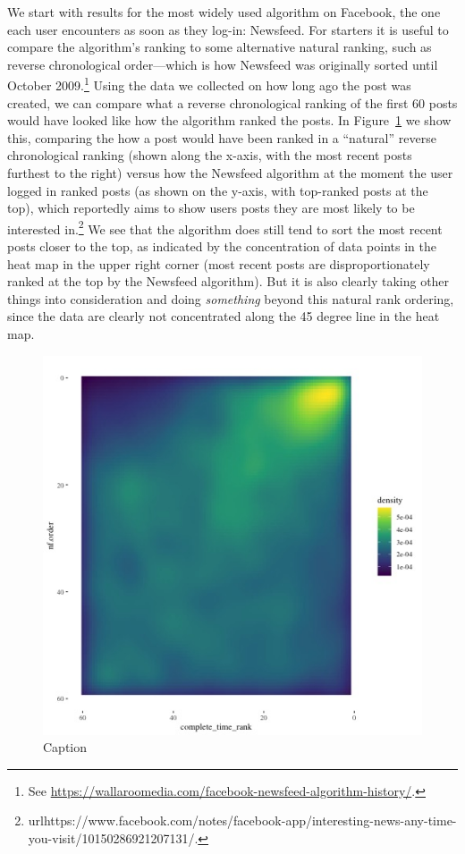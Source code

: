 \documentclass[12pt,letterpaper]{article}
\begin{document}
We start with results for the most widely used algorithm on Facebook, the one each user encounters as soon as they log-in: Newsfeed. For starters it is useful to compare the algorithm's ranking to some alternative natural ranking, such as reverse chronological order---which is how Newsfeed was originally sorted until October 2009.\footnote{See \url{https://wallaroomedia.com/facebook-newsfeed-algorithm-history/}.} Using the data we collected on how long ago the post was created, we can compare what a reverse chronological ranking of the first 60 posts would have looked like how the algorithm ranked the posts. In Figure~\ref{fig:nftime} we show this, comparing the how a post would have been ranked in a ``natural'' reverse chronological ranking (shown along the x-axis, with the most recent posts furthest to the right) versus how the Newsfeed algorithm at the moment the user logged in ranked posts (as shown on the y-axis, with top-ranked posts at the top), which reportedly aims to show users posts they are most likely to be interested in.\footnote{url{https://www.facebook.com/notes/facebook-app/interesting-news-any-time-you-visit/10150286921207131/}.} We see that the algorithm does still tend to sort the most recent posts closer to the top, as indicated by the concentration of data points in the heat map in the upper right corner (most recent posts are disproportionately ranked at the top by the Newsfeed algorithm). But it is also clearly taking other things into consideration and doing \emph{something} beyond this natural rank ordering, since the data are clearly not concentrated along the 45 degree line in the heat map.

\begin{figure}[h]
    \centering
    \includegraphics[scale=.8]{Output/Graphs/Audit/Heatmaps/US NF chron rank by nf rank - smooth.jpg}
    \caption{Caption}
    \label{fig:nftime}
\end{figure}
\end{document}
